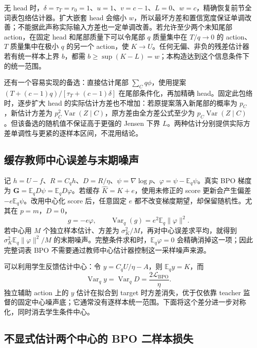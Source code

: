\documentclass[lang=cn,scheme=chinese,openany]{../book/elegantbook}
\newcommand{\E}{\mathbb E}
\newcommand{\Var}{\operatorname{Var}}
\begin{document}
无 head 时，$\delta=\tau_T=r_0=1$、$u=1$、$v=c-1$、$L=0$、$w=c$，精确恢复前节全词表包络估计器。扩大嵌套 head 会缩小 $w$，所以最坏方差和置信宽度保证单调改善；不能据此声称实际输入方差也一定单调改善。若允许至少两个未知尾部 action，在固定 head 和尾部质量下可以令尾部 $q$ 质量集中在 $T/q\to0$ 的 action、$T$ 质量集中在极小 $q$ 的另一个 action，使 $K\to U$。任何无偏、非负的残差估计器若有统一样本上界 $b$，都需 $b\ge\sup(K-L)=w$；本构造达到这个信息条件下的统一范围。

还有一个容易实现的备选：直接估计尾部 $\sum_Cq\phi$，使用提案 $(T+(c-1)q)/[\tau_T+(c-1)\delta]$ 在尾部条件化，再加精确 head。固定此包络时，逐步扩大 head 的实际估计方差也不增加：若原提案落入新尾部的概率为 $p_C$，新估计方差为 $p_C^2\Var(Z\mid C)$，原方差由全方差公式至少为 $p_C\Var(Z\mid C)$。但该备选的随机值不保证高于更强的 Jensen 下界 $L$。两种估计分别提供实际方差单调性与更紧的逐样本区间，不混用结论。



\subsection{缓存教师中心误差与末期噪声}

记 $h=U-f$、$R=C_qh$、$D=R/\eta$、$\psi=\nabla\log p$、$\varphi=\psi-\E_q\psi$。真实 BPO 梯度为 $\bm G=\E_qD\psi=\E_qD\varphi$。若缓存 $\widehat K=K+e$，使用未修正的 score 更新会产生偏差 $-e\E_q\psi$。改用中心化 score 后，任意固定 $e$ 都不改变梯度期望，却保留随机性。尤其在 $p=m$，$D=0$，
\begin{equation}
 g=-e\varphi,\qquad
 \Var_q(g)=e^2\E_q\|\varphi\|^2.
\end{equation}
若中心用 $M$ 个独立样本估计、方差为 $\sigma_K^2/M$，再对中心误差求平均，就得到 $\sigma_K^2\E_q\|\varphi\|^2/M$ 的末期噪声。完整条件求和时，$\E_q\varphi=0$ 会精确消掉这一项；因此完整词表 BPO 不需要通过教师中心估计器控制这一采样噪声来源。

可以利用学生反馈估计中心：令 $y=C_qU/\eta-A$，则 $\E_qy=K$，而
\begin{equation}
 \Var_qy=\Var_qD=\frac{2\mathcal L_{\mathrm{BPO}}}{\eta}.
\end{equation}
独立辅助 action 上的 $y$ 估计在拟合到 target 时方差消失，优于仅依靠 teacher 监督的固定中心噪声底；它通常没有逐样本统一范围。下面将这个差分进一步对称化，同时消去学生条件中心。
\subsection{不显式估计两个中心的 BPO 二样本损失}
\end{document}
